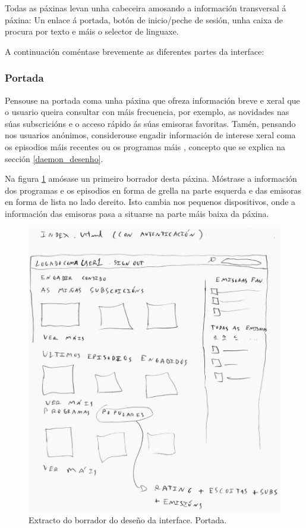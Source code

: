 Todas as páxinas levan unha cabeceira amosando a información transversal á páxina: Un enlace á portada, botón de inicio/peche de sesión, unha caixa de procura por texto e máis o selector de linguaxe. 

A continuación coméntase brevemente as diferentes partes da interface:

\subsubsection{Portada}

Pensouse na portada coma unha páxina que ofreza información breve e xeral que o usuario queira consultar con máis frecuencia, por exemplo, as novidades nas súas subscricións e o acceso rápido ás súas emisoras favoritas. Tamén, pensando nos usuarios anónimos, considerouse engadir información de interese xeral coma os episodios máis recentes ou os programas máis , concepto que se explica na sección \ref{daemon_desenho}.

Na figura \ref{fig:index1_p} amósase un primeiro borrador desta páxina. Móstrase a información dos programas e os episodios en forma de grella na parte esquerda e das emisoras en forma de lista no lado dereito. Isto cambia nos pequenos dispositivos, onde a información das emisoras pasa a situarse na parte máis baixa da páxina.

\begin{figure}[h]
	\centering
	\includegraphics[scale=0.2,keepaspectratio=true]{./images/index1_p.png}
	\caption{Extracto do borrador do deseño da interface. Portada.}
	\label{fig:index1_p}
\end{figure}


